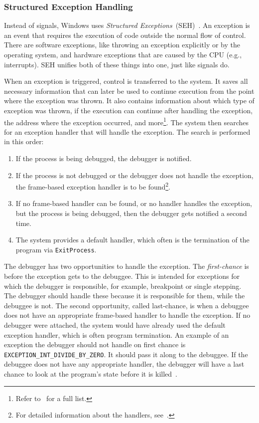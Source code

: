 \subsubsection*{Structured Exception Handling}\label{section:seh}
Instead of signals, Windows uses \textit{Structured
Exceptions}~(SEH)~\cite{windows-msdn-seh}. An exception is an event that
requires the execution of code outside the normal flow of control. There are
software exceptions, like throwing an exception explicitly or by the operating
system, and hardware exceptions that are caused by the CPU (e.g., interrupts).
SEH unifies both of these things into one, just like signals do.

When an exception is triggered, control is transferred to the system. It saves
all necessary information that can later be used to continue execution from the
point where the exception was thrown. It also contains information about which
type of exception was thrown, if the execution can continue after handling the
exception, the address where the exception occurred, and more\footnote{Refer
to~\cite{windows-msdn-seh} for a full list.}. The system then searches for an
exception handler that will handle the exception. The search is performed in
this order:

\begin{enumerate}
    \item If the process is being debugged, the debugger is notified.
    \item If the process is not debugged or the debugger does not handle the
        exception, the frame-based exception handler is to be
        found\footnote{For detailed information about the handlers,
        see~\cite{windows-msdn-seh}.}.
    \item If no frame-based handler can be found, or no handler handles the
        exception, but the process is being debugged, then the debugger gets
        notified a second time.
    \item The system provides a default handler, which often is the termination of
        the program via \texttt{ExitProcess}.
\end{enumerate}
The debugger has two opportunities to handle the exception. The
\textit{first-chance} is before the exception gets to the debuggee. This is
intended for exceptions for which the debugger is responsible, for example,
breakpoint or single stepping. The debugger should handle these because it is
responsible for them, while the debuggee is not. The second opportunity, called
last-chance, is when a debuggee does not have an appropriate frame-based
handler to handle the exception. If no debugger were attached, the system would
have already used the default exception handler, which is often program
termination. An example of an exception the debugger should not handle on first
chance is \verb|EXCEPTION_INT_DIVIDE_BY_ZERO|. It should pass it along to the
debuggee. If the debuggee does not have any appropriate handler, the debugger
will have a last chance to look at the program's state before it is
killed~\cite{windows-msdn-dbg-exc-handling}.

